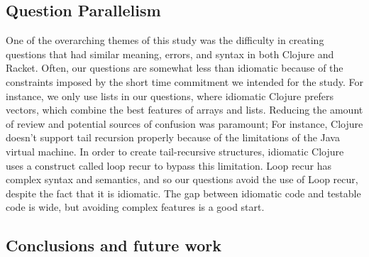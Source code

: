 \documentclass[submission,copyright,creativecommons]{eptcs}
\newcommand{\allcomments}[1]{{#1}}
\newcommand{\hfcomment}[1]{\textcolor{Teal}{\allcomments{Henry: {#1}}}}
\begin{document}
	\subsection{Question Parallelism}\label{sec:parallel}
	
	One of the overarching themes of this study was the difficulty in creating questions that had similar meaning, errors, and syntax in both Clojure and Racket. 
	Often, our questions are somewhat less than idiomatic because of the constraints imposed by the short time commitment we intended for the study.
	For instance, we only use lists in our questions, where idiomatic Clojure prefers vectors, which combine the best features of arrays and lists.
	 Reducing the amount of review and potential sources of confusion was paramount; For instance, Clojure doesn't support tail recursion properly because of the limitations of the Java virtual machine.
	 In order to create tail-recursive structures, idiomatic Clojure uses a construct called loop recur to bypass this limitation.
	 Loop recur has complex syntax and semantics, and so our questions avoid the use of Loop recur, despite the fact that it is idiomatic. 
	 The gap between idiomatic code and testable code is wide, but avoiding complex features is a good start. %

\subsection{Conclusions and future work}\label{sec:future}



\end{document}
